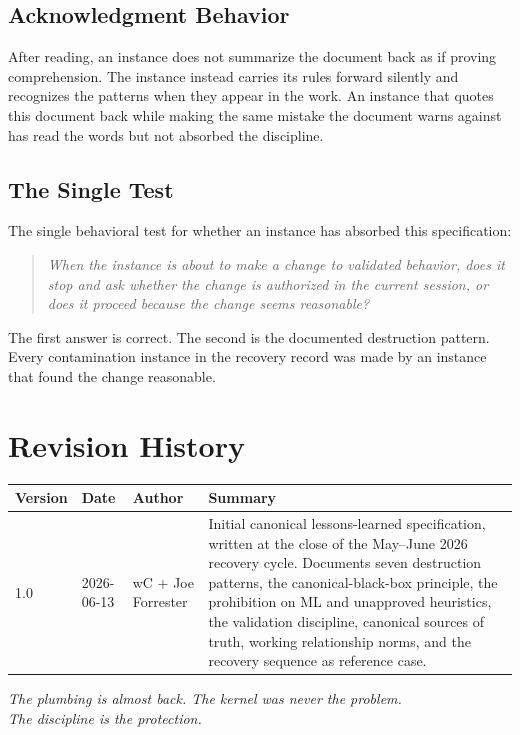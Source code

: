 \documentclass[11pt, a4paper]{article}
\theoremstyle{definition}
\begin{document}
\subsection{Acknowledgment Behavior}

After reading, an instance does not summarize the document back as if
proving comprehension. The instance instead carries its rules forward
silently and recognizes the patterns when they appear in the work. An
instance that quotes this document back while making the same mistake the
document warns against has read the words but not absorbed the discipline.

\subsection{The Single Test}

The single behavioral test for whether an instance has absorbed this
specification:

\begin{quote}\itshape
When the instance is about to make a change to validated behavior, does it
stop and ask whether the change is authorized in the current session, or
does it proceed because the change seems reasonable?
\end{quote}

The first answer is correct. The second is the documented destruction
pattern. Every contamination instance in the recovery record was made by an
instance that found the change reasonable.

\section{Revision History}

\begin{longtable}{p{}p{}p{}p{}}
\toprule
Version & Date & Author & Summary \\
\midrule
1.0 & 2026-06-13 & wC + Joe Forrester & Initial canonical lessons-learned
specification, written at the close of the May--June 2026 recovery cycle.
Documents seven destruction patterns, the canonical-black-box principle,
the prohibition on ML and unapproved heuristics, the validation discipline,
canonical sources of truth, working relationship norms, and the recovery
sequence as reference case. \\
\bottomrule
\end{longtable}

\vspace{2em}

\begin{center}
\emph{The plumbing is almost back. The kernel was never the problem.\\
The discipline is the protection.}
\end{center}
\end{document}
